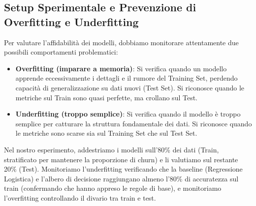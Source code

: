 \documentclass[a4paper,11pt]{article}
\begin{document}
\subsection{Setup Sperimentale e Prevenzione di Overfitting e Underfitting}
Per valutare l'affidabilità dei modelli, dobbiamo monitorare attentamente due possibili comportamenti problematici:
\begin{itemize}
    \item \textbf{Overfitting (imparare a memoria)}: Si verifica quando un modello apprende eccessivamente i dettagli e il rumore del Training Set, perdendo capacità di generalizzazione su dati nuovi (Test Set). Si riconosce quando le metriche sul Train sono quasi perfette, ma crollano sul Test.
    \item \textbf{Underfitting (troppo semplice)}: Si verifica quando il modello è troppo semplice per catturare la struttura fondamentale dei dati. Si riconosce quando le metriche sono scarse sia sul Training Set che sul Test Set.
\end{itemize}
Nel nostro esperimento, addestriamo i modelli sull'80\% dei dati (Train, stratificato per mantenere la proporzione di churn) e li valutiamo sul restante 20\% (Test). Monitoriamo l'underfitting verificando che la baseline (Regressione Logistica) e l'albero di decisione raggiungano almeno l'80\% di accuratezza sul train (confermando che hanno appreso le regole di base), e monitoriamo l'overfitting controllando il divario tra train e test.
\end{document}
